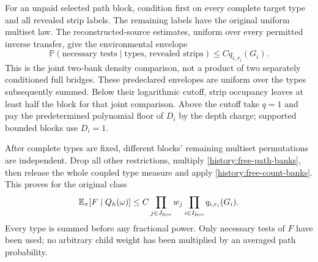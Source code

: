 For an unpaid selected path block, condition first on every complete
target type and all revealed strip labels. The remaining labels have
the original uniform multiset law. The reconstructed-source estimates,
uniform over every permitted inverse transfer, give the environmental
envelope
\begin{equation}
 \mathbb P(\text{necessary tests}\mid\text{types, revealed strips})
                           \le Cq_{i,r_i}(G_i).
 \label{history:free-path-banks}
\end{equation}
This is the joint two-bank density comparison, not a product of two
separately conditioned full bridges. These predeclared envelopes are
uniform over the types subsequently summed. Below their logarithmic
cutoff, strip occupancy leaves at least half the block for that joint
comparison. Above the cutoff take $q=1$ and pay the predetermined
polynomial floor of $D_i$ by the depth charge; supported bounded
blocks use $D_i=1$.

After complete types are fixed, different blocks' remaining multiset
permutations are independent. Drop all other restrictions, multiply
\eqref{history:free-path-banks}, then release the whole coupled type
measure and apply \eqref{history:free-count-banks}. This proves for
the original class
\begin{equation}
 \mathbb E_\pi[F\mid Q_h(\omega)]
 \le C\prod_{j\in J_{\rm free}}w_j
                 \prod_{i\in I_{\rm free}}q_{i,r_i}(G_i).
 \label{history:actual-class}
\end{equation}
Every type is summed before any fractional power. Only necessary tests
of $F$ have been used; no arbitrary child weight has been multiplied
by an averaged path probability.

